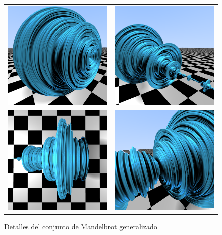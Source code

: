 \begin{figure}[ht]
    \centering
    \begin{tabular}{cc}
        \includegraphics[width=6.5cm]{img/C9/mandelbrot-2.png} &
      \includegraphics[width=6.5cm]{img/C9/mandelbrot-1.png} \\    
    \includegraphics[width=6.5cm]{img/C9/mandelbrot-3.png} &     \includegraphics[width=6.5cm]{img/C9/mandelbrot-4.png} \\
    \end{tabular}
    \caption{Detalles del conjunto de Mandelbrot generalizado}
    \label{fig:mandelbrot-3D}
\end{figure}

